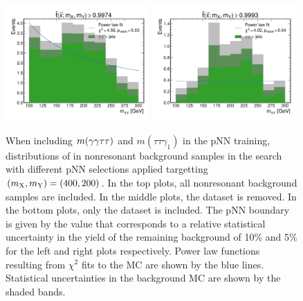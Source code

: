 \begin{figure}
    \includegraphics[width=0.49\textwidth]{Figures/Dihiggs/categorisation/mgg_sculpting/y_gg_high_mass_original/only_diphoton/intermediate_transformed_score_NMSSM_XYH_Y_gg_H_tautau_MX_400_MY_200_frac_uncert_0.05.pdf}
    \includegraphics[width=0.49\textwidth]{Figures/Dihiggs/categorisation/mgg_sculpting/y_gg_high_mass_original/only_diphoton/intermediate_transformed_score_NMSSM_XYH_Y_gg_H_tautau_MX_400_MY_200_frac_uncert_0.1.pdf}
    \caption[Evidence of \mgg Sculpting in High-Mass \XYggHtt Search When Including $m(\ggtt)$ and $m(\tau\tau\gamma_1)$ as Training Features]{When including $m(\ggtt)$ and $m(\tau\tau\gamma_1)$ in the pNN training, distributions of \mgg in nonresonant background samples in the \XYggHtt search with different pNN selections applied targetting $(m_{\mathrm{X}}, m_{\mathrm{Y}}) = (400,200)$\GeV. In the top plots, all nonresonant background samples are included. In the middle plots, the \gjet dataset is removed. In the bottom plots, only the \ggjet dataset is included. The pNN boundary is given by the value that corresponds to a relative statistical uncertainty in the yield of the remaining background of 10\% and 5\% for the left and right plots respectively. Power law functions resulting from $\chi^2$ fits to the MC are shown by the blue lines. Statistical uncertainties in the background MC are shown by the shaded bands.}\label{fig:mgg_sculpting_y_gg_high_mass_original}
\end{figure}

